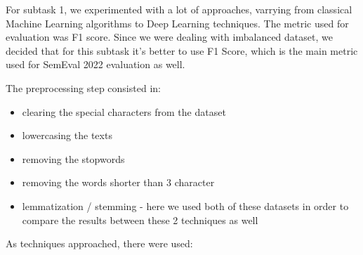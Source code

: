 \documentclass[11pt]{article}
\begin{document}
For subtask 1, we experimented with a lot of approaches, varrying from
classical Machine Learning algorithms to Deep Learning techniques. The
metric used for evaluation was F1 score. Since we were dealing with
imbalanced dataset, we decided that for this subtask it's better to use F1
Score, which is the main metric used for SemEval 2022 evaluation as well.

The preprocessing step consisted in:

\begin{itemize}
\item clearing the special characters from the dataset

\item lowercasing the texts

\item removing the stopwords

\item removing the words shorter than 3 character

\item lemmatization / stemming - here we used both of these datasets in
order to compare the results between these 2 techniques as well
\end{itemize}

\bigskip

As techniques approached, there were used:
\end{document}

